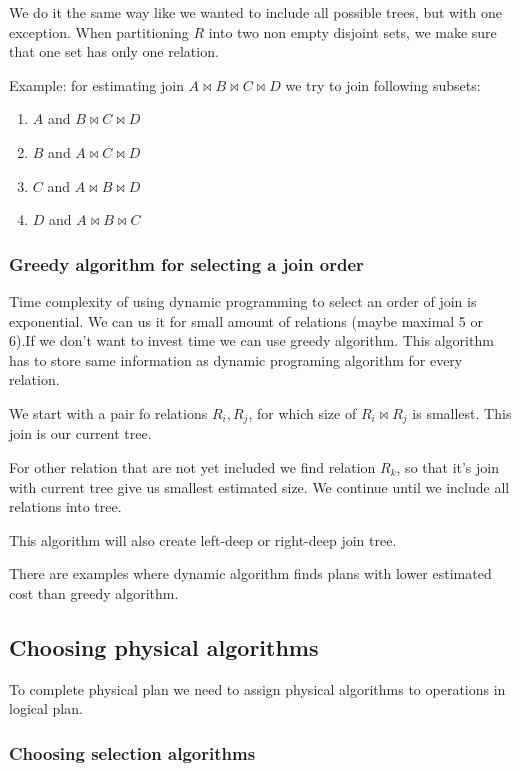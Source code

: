 We do it the same way like we wanted to include all possible trees, but with one exception. When partitioning $R$ into two non empty disjoint sets, we make sure that one set has only one relation.

Example: for estimating join $A\Join B\Join C\Join D$ we try to join following subsets:
\begin{enumerate}
\item $A$ and $B\Join C\Join D$
\item $B$ and $A\Join C\Join D$
\item $C$ and $A\Join B\Join D$
\item $D$ and $A\Join B\Join C$
\end{enumerate}

\subsubsection{Greedy algorithm for selecting a join order}
\label{greedyalgorithm}
Time complexity of using dynamic programming to select an order of join is exponential. We can us it for small amount of relations (maybe maximal 5 or 6).If we don't want to invest time we can use greedy algorithm. This algorithm has to store same information as dynamic programing algorithm for every relation.

We start with a pair fo relations $R_i, R_j$, for which size of $R_i \Join R_j$ is smallest. This join is our current tree.

For other relation that are not yet included we find relation $R_k$, so that it's join with current tree give us smallest estimated size. We continue until we include all relations into tree. 

This algorithm will also create left-deep or right-deep join tree.

There are examples where dynamic algorithm finds plans with lower estimated cost than greedy algorithm.
 
\subsection{Choosing physical algorithms}

To complete physical plan we need to assign physical algorithms to operations in logical plan.
\subsubsection{Choosing selection algorithms}

